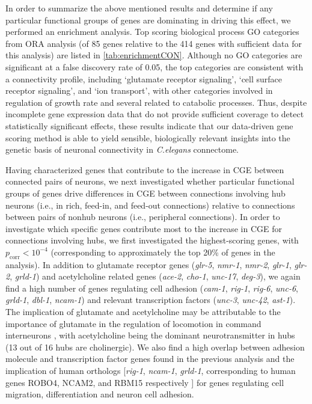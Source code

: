 {In order to summarize the above mentioned results and determine if any particular functional groups of genes are dominating in driving this effect, we performed an enrichment analysis.
Top scoring biological process GO categories from ORA analysis (of 85 genes relative to the 414 genes with sufficient data for this analysis) are listed in \ref{tab:enrichmentCON}.
Although no GO categories are significant at a false discovery rate of 0.05, the top categories are consistent with a connectivity profile, including `glutamate receptor signaling', `cell surface receptor signaling', and `ion transport', with other categories involved in regulation of growth rate and several related to catabolic processes.
Thus, despite incomplete gene expression data that do not provide sufficient coverage to detect statistically significant effects, these results indicate that our data-driven gene scoring method is able to yield sensible, biologically relevant insights into the genetic basis of neuronal connectivity in \textit{C.elegans} connectome.

Having characterized genes that contribute to the increase in CGE between connected pairs of neurons, we next investigated whether particular functional groups of genes drive differences in CGE between connections involving hub neurons (i.e., in rich, feed-in, and feed-out connections) relative to connections between pairs of nonhub neurons (i.e., peripheral connections).
In order to investigate which specific genes contribute most to the increase in CGE for connections involving hubs, we first investigated the highest-scoring genes, with $p_\mathrm{corr} < 10^{-4}$ (corresponding to approximately the top 20\% of genes in the analysis).
In addition to glutamate receptor genes (\emph{glr-5}, \emph{nmr-1}, \emph{nmr-2}, \emph{glr-1}, \emph{glr-2}, \emph{grld-1})
and acetylcholine related genes (\emph{ace-2}, \emph{cho-1}, \emph{unc-17}, \emph{deg-3}),
we again find a high number of genes regulating cell adhesion (\emph{cam-1}, \emph{rig-1}, \emph{rig-6}, \emph{unc-6}, \emph{grld-1}, \emph{dbl-1}, \emph{ncam-1})
and relevant transcription factors (\emph{unc-3}, \emph{unc-42}, \emph{ast-1}).
The implication of glutamate and acetylcholine may be attributable to the importance of glutamate in the regulation of locomotion in command interneurons \citep{Choi2015, Zheng1999}, with acetylcholine being the dominant neurotransmitter in hubs (13 out of 16 hubs are cholinergic).
We also find a high overlap between adhesion molecule and transcription factor genes found in the previous analysis and the implication of human orthologs [\emph{rig-1}, \emph{ncam-1}, \emph{grld-1}, corresponding to human genes ROBO4, NCAM2, and RBM15 respectively  \citep{Harris2010}] for genes regulating cell migration, differentiation and neuron cell adhesion.

}
